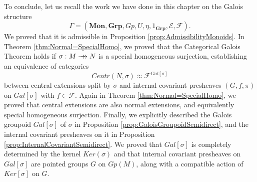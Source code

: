 To conclude, let us recall the work we have done in this chapter on the Galois structure
\[ \Gamma = (\textbf{Mon}, \textbf{Grp}, Gp, U, \eta, 1_{\textbf{Grp}}, \mathscr{E}, \mathscr{F}). \]
We proved that it is admissible in Proposition \ref{prop:AdmissibilityMonoids}. In Theorem \ref{thm:Normal=SpecialHomo}, we proved that the Categorical Galois Theorem holds if $\sigma:M\rrightarrow N$ is a special homogeneous surjection, establishing an equivalence of categories
\[ Centr(N,\sigma)\approx \mathscr{F}^{Gal[\sigma]} \]
between central extensions split by $\sigma$ and internal covariant presheaves $(G,f,\pi)$ on $Gal[\sigma]$ with $f\in \mathscr{F}$. Again in Theorem \ref{thm:Normal=SpecialHomo}, we proved that central extensions are also normal extensions, and equivalently special homogeneous surjection. Finally, we explicitly described the Galois groupoid $Gal[\sigma]$ of $\sigma$ in Proposition \ref{prop:GaloisGroupoidSemidirect}, and the internal covariant presheaves on it in Proposition \ref{prop:InternalCovariantSemidirect}. We proved that $Gal[\sigma]$ is completely determined by the kernel $Ker(\sigma)$ and that internal covariant presheaves on $Gal[\sigma]$ are pointed groups $G$ on $Gp(M)$, along with a compatible action of $Ker[\sigma]$ on $G$.